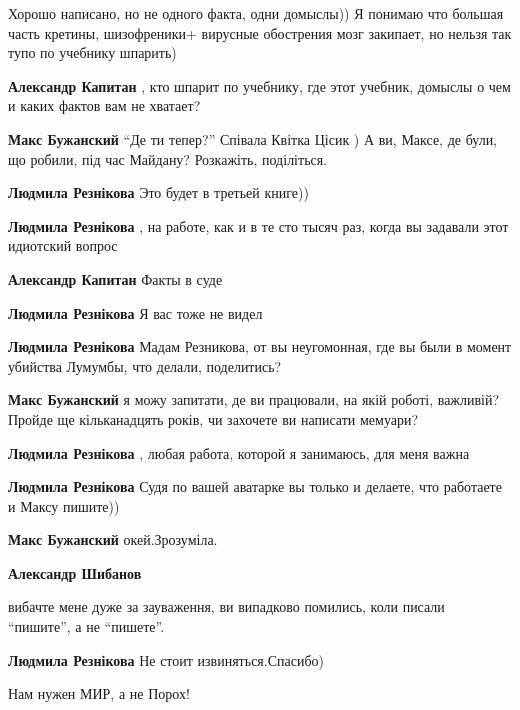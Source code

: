 \begin{itemize}

Хорошо написано, но не одного факта, одни домыслы)) Я понимаю что большая часть
кретины, шизофреники+ вирусные обострения мозг закипает, но нельзя так тупо по
учебнику шпарить)

\begin{itemize} %
\textbf{Александр Капитан} , кто шпарит по учебнику, где этот учебник, домыслы о чем и каких фактов вам не хватает?

\textbf{Макс Бужанский} \enquote{Де ти тепер?} Співала Квітка Цісик ) А ви, Максе, де були, що робили, під час Майдану? Розкажіть, поділіться.

\textbf{Людмила Резнікова} Это будет в третьей книге))

\textbf{Людмила Резнікова} , на работе, как и в те сто тысяч раз, когда вы задавали этот идиотский вопрос

\textbf{Александр Капитан} Факты в суде

\textbf{Людмила Резнікова} Я вас тоже не видел

\textbf{Людмила Резнікова} Мадам Резникова, от вы неугомонная, где вы были в момент убийства Лумумбы, что делали, поделитись?

\textbf{Макс Бужанский} я можу запитати, де ви працювали, на якій роботі, важливій? Пройде ще кільканадцять років, чи захочете ви написати мемуари?

\textbf{Людмила Резнікова} , любая работа, которой я занимаюсь, для меня важна

\textbf{Людмила Резнікова} Судя по вашей аватарке вы только и делаете, что работаете и Максу пишите))

\textbf{Макс Бужанский} окей.Зрозуміла.

\textbf{Александр Шибанов} 

вибачте мене дуже за зауваження, ви випадково помились, коли писали
\enquote{пишите}, а не \enquote{пишете}.

\textbf{Людмила Резнікова} Не стоит извиняться.Спасибо)
\end{itemize} %

Нам нужен МИР, а не Порох!



\end{itemize}
